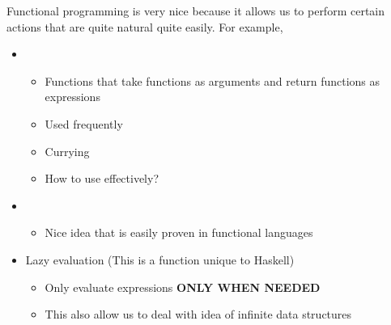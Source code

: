 Functional programming is very nice because it allows us to perform certain actions that are quite natural quite easily.
For example,
\begin{itemize}[noitemsep]
\item {}
  \begin{itemize}[noitemsep]
  \item Functions that take functions as arguments and return functions as expressions
  \item Used frequently
  \item Currying
  \item How to use effectively?
  \end{itemize}

\item {}
  \begin{itemize}[noitemsep]
  \item Nice idea that is easily proven in functional languages
  \end{itemize}

\item Lazy evaluation (This is a function unique to Haskell)
  \begin{itemize}[noitemsep]
  \item Only evaluate expressions \textbf{ONLY WHEN NEEDED}
  \item This also allow us to deal with idea of infinite data structures
  \end{itemize}
\end{itemize}







